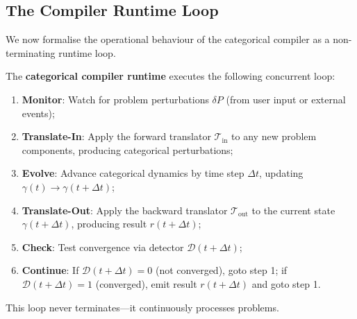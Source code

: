 \subsection{The Compiler Runtime Loop}

We now formalise the operational behaviour of the categorical compiler as a non-terminating runtime loop.

\begin{definition}
\label{def:compiler_runtime}
The \textbf{categorical compiler runtime} executes the following concurrent loop:
\begin{enumerate}
    \item \textbf{Monitor}: Watch for problem perturbations $\delta P$ (from user input or external events);
    \item \textbf{Translate-In}: Apply the forward translator $\mathcal{T}_{\text{in}}$ to any new problem components, producing categorical perturbations;
    \item \textbf{Evolve}: Advance categorical dynamics by time step $\Delta t$, updating $\gamma(t) \to \gamma(t + \Delta t)$;
    \item \textbf{Translate-Out}: Apply the backward translator $\mathcal{T}_{\text{out}}$ to the current state $\gamma(t + \Delta t)$, producing result $r(t + \Delta t)$;
    \item \textbf{Check}: Test convergence via detector $\mathcal{D}(t + \Delta t)$;
    \item \textbf{Continue}: If $\mathcal{D}(t + \Delta t) = 0$ (not converged), goto step 1; if $\mathcal{D}(t + \Delta t) = 1$ (converged), emit result $r(t + \Delta t)$ and goto step 1.
\end{enumerate}
This loop never terminates—it continuously processes problems.
\end{definition}

